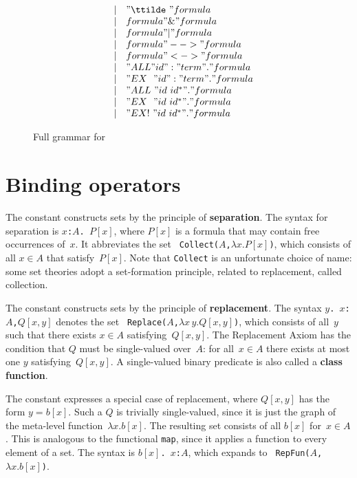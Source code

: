 \begin{figure}
\[\begin{array}{rcl}
         & | & "\ttilde\ " formula \\
         & | & formula " \& " formula \\
         & | & formula " | " formula \\
         & | & formula " --> " formula \\
         & | & formula " <-> " formula \\
         & | & "ALL " id ":" term " . " formula \\
         & | & "EX~~" id ":" term " . " formula \\
         & | & "ALL~" id~id^* " . " formula \\
         & | & "EX~~" id~id^* " . " formula \\
         & | & "EX!~" id~id^* " . " formula
  \end{array}
\]
\caption{Full grammar for {\ZF}} \label{zf-syntax}
\end{figure} 


\section{Binding operators}
The constant  constructs sets by the principle of {\bf
  separation}.  The syntax for separation is
\hbox{\tt\ttlbrace$x$:$A$.\ $P[x]$\ttrbrace}, where $P[x]$ is a formula
that may contain free occurrences of~$x$.  It abbreviates the set {\tt
  Collect($A$,$\lambda x. P[x]$)}, which consists of all $x\in A$ that
satisfy~$P[x]$.  Note that \texttt{Collect} is an unfortunate choice of
name: some set theories adopt a set-formation principle, related to
replacement, called collection.

The constant  constructs sets by the principle of {\bf
  replacement}.  The syntax
\hbox{\tt\ttlbrace$y$.\ $x$:$A$,$Q[x,y]$\ttrbrace} denotes the set {\tt
  Replace($A$,$\lambda x\,y. Q[x,y]$)}, which consists of all~$y$ such
that there exists $x\in A$ satisfying~$Q[x,y]$.  The Replacement Axiom
has the condition that $Q$ must be single-valued over~$A$: for
all~$x\in A$ there exists at most one $y$ satisfying~$Q[x,y]$.  A
single-valued binary predicate is also called a {\bf class function}.

The constant  expresses a special case of replacement,
where $Q[x,y]$ has the form $y=b[x]$.  Such a $Q$ is trivially
single-valued, since it is just the graph of the meta-level
function~$\lambda x. b[x]$.  The resulting set consists of all $b[x]$
for~$x\in A$.  This is analogous to the \ML{} functional \texttt{map},
since it applies a function to every element of a set.  The syntax is
\hbox{\tt\ttlbrace$b[x]$.\ $x$:$A$\ttrbrace}, which expands to {\tt
  RepFun($A$,$\lambda x. b[x]$)}.

